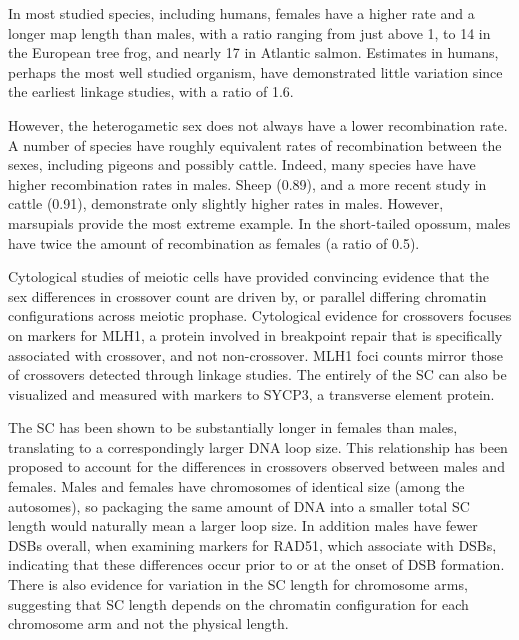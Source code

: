 In most studied species, including humans, females have a higher rate and a longer map length than males, with a ratio ranging from just above 1, to 14 in the European tree frog\cite{Berset-Brandli2008}, and nearly 17 in Atlantic salmon\cite{Danzmann2005}.
Estimates in humans, perhaps the most well studied organism, have demonstrated little variation since the earliest linkage studies, with a ratio of 1.6.

However, the heterogametic sex does not always have a lower recombination rate.
A number of species have roughly equivalent rates of recombination between the sexes, including pigeons\cite{Pigozzi1999} and possibly cattle\cite{Kappes1997}. %
Indeed, many species have have higher recombination rates in males.
Sheep\cite{Crawford1995} (0.89), and a more recent study in cattle\cite{Ma2015} (0.91), demonstrate only slightly higher rates in males.
However, marsupials provide the most extreme example. 
In the short-tailed opossum\cite{Samollow2004},  males have twice the amount of recombination as females (a ratio of 0.5).



Cytological studies of meiotic cells have provided convincing evidence that the sex differences in crossover count are driven by, or parallel differing chromatin configurations across meiotic prophase.
Cytological evidence for crossovers focuses on markers for MLH1, a protein involved in breakpoint repair that is specifically associated with crossover, and not non-crossover\cite{Baker1996}.
MLH1 foci counts mirror those of crossovers detected through linkage studies\cite{Tease2004,Gruhn2013}.
The entirely of the SC can also be visualized and measured with markers to SYCP3, a transverse element protein.

The SC has been shown to be substantially longer in females than males, translating to a correspondingly larger DNA loop size\cite{Tease2004,Gruhn2013}.
This relationship has been proposed to account for the differences in crossovers observed between males and females.
Males and females have chromosomes of identical size (among the autosomes), so packaging the same amount of DNA into a smaller total SC length would naturally mean a larger loop size.
In addition males have fewer DSBs overall, when examining markers for RAD51, which associate with DSBs, indicating that these differences occur prior to or at the onset of DSB formation\cite{Gruhn2013}.
There is also evidence for variation in the SC length for chromosome arms, suggesting that SC length depends on the chromatin configuration for each chromosome arm and not the physical length\cite{Codina-Pascual2006a}.

